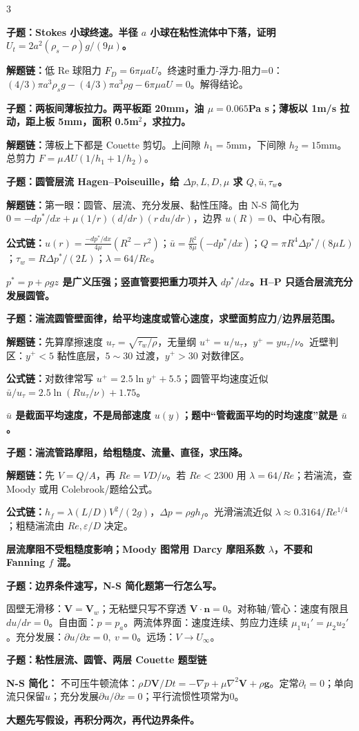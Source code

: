 \documentclass[a4paper]{article}
\newcommand{\qt}[1]{\vspace{0.10pt}\colorbox{Q}{\parbox{\dimexpr\linewidth-2\fboxsep}{\color{white}\bfseries #1}}\par}
\newcommand{\ans}[1]{\colorbox{G}{\parbox{\dimexpr\linewidth-2\fboxsep}{#1}}\par}
\newcommand{\warn}[1]{\colorbox{Y}{\parbox{\dimexpr\linewidth-2\fboxsep}{\color{E}\bfseries #1}}\par}
\newcommand{\chain}[1]{{\color{A}\bfseries 解题链：}#1\par}
\newcommand{\form}[1]{{\color{M}\bfseries 公式链：}#1\par}
\newcommand{\sect}[1]{\par{\bfseries\color{Q}#1：}}
\newcommand{\schemeviscous}{}
\begin{document}
\begin{multicols}{3}
\qt{子题：Stokes 小球终速。半径 $a$ 小球在粘性流体中下落，证明 $U_t=2a^2(\rho_s-\rho)g/(9\mu)$。}
\chain{低 Re 球阻力 $F_D=6\pi\mu aU$。终速时重力-浮力-阻力=0：$(4/3)\pi a^3\rho_sg-(4/3)\pi a^3\rho g-6\pi\mu aU=0$。解得结论。}

\qt{子题：两板间薄板拉力。两平板距 20mm，油 $\mu=0.065$Pa s；薄板以 1m/s 拉动，距上板 5mm，面积 0.5m$^2$，求拉力。}
\chain{薄板上下都是 Couette 剪切。上间隙 $h_1=5$mm，下间隙 $h_2=15$mm。总剪力 $F=\mu AU(1/h_1+1/h_2)$。}

\qt{子题：圆管层流 Hagen--Poiseuille，给 $\Delta p,L,D,\mu$ 求 $Q,\bar u,\tau_w$。}
\chain{第一眼：圆管、层流、充分发展、黏性压降。由 N-S 简化为 $0=-dp^*/dx+\mu(1/r)(d/dr)(r\,du/dr)$，边界 $u(R)=0$、中心有限。}
\form{$u(r)=\frac{-dp^*/dx}{4\mu}(R^2-r^2)$；$\bar u=\frac{R^2}{8\mu}(-dp^*/dx)$；$Q=\pi R^4\Delta p^*/(8\mu L)$；$\tau_w=R\Delta p^*/(2L)$；$\lambda=64/Re$。}
\warn{$p^*=p+\rho gz$ 是广义压强；竖直管要把重力项并入 $dp^*/dx$。H--P 只适合层流充分发展圆管。}

\qt{子题：湍流圆管壁面律，给平均速度或管心速度，求壁面剪应力/边界层范围。}
\chain{先算摩擦速度 $u_\tau=\sqrt{\tau_w/\rho}$，无量纲 $u^+=u/u_\tau$，$y^+=yu_\tau/\nu$。近壁判区：$y^+<5$ 黏性底层，$5\sim30$ 过渡，$y^+>30$ 对数律区。}
\form{对数律常写 $u^+=2.5\ln y^+ +5.5$；圆管平均速度近似 $\bar u/u_\tau=2.5\ln(Ru_\tau/\nu)+1.75$。}
\warn{$\bar u$ 是截面平均速度，不是局部速度 $u(y)$；题中“管截面平均的时均速度”就是 $\bar u$。}

\qt{子题：湍流管路摩阻，给粗糙度、流量、直径，求压降。}
\chain{先 $V=Q/A$，再 $Re=VD/\nu$。若 $Re<2300$ 用 $\lambda=64/Re$；若湍流，查 Moody 或用 Colebrook/题给公式。}
\form{$h_f=\lambda(L/D)V^2/(2g)$，$\Delta p=\rho gh_f$。光滑湍流近似 $\lambda\approx0.3164/Re^{1/4}$；粗糙湍流由 $Re,\varepsilon/D$ 决定。}
\warn{层流摩阻不受粗糙度影响；Moody 图常用 Darcy 摩阻系数 $\lambda$，不要和 Fanning $f$ 混。}

\qt{子题：边界条件速写，N-S 简化题第一行怎么写。}
\ans{固壁无滑移：$\bm V=\bm V_w$；无粘壁只写不穿透 $\bm V\cdot\bm n=0$。对称轴/管心：速度有限且 $du/dr=0$。自由面：$p=p_a$。两流体界面：速度连续、剪应力连续 $\mu_1u_1'=\mu_2u_2'$。充分发展：$\partial u/\partial x=0,\ v=0$。远场：$V\to U_\infty$。}


\qt{子题：粘性层流、圆管、两层 Couette 题型链}
{\fontsize{2.66}{2.82}\selectfont
\schemeviscous
\sect{N-S 简化}
不可压牛顿流体：$\rho D\bm V/Dt=-\nabla p+\mu\nabla^2\bm V+\rho\bm g$。定常$\partial_t=0$；单向流只保留$u$；充分发展$\partial u/\partial x=0$；平行流惯性项常为0。\\
\warn{大题先写假设，再积分两次，再代边界条件。}

}
\end{multicols}
\end{document}

